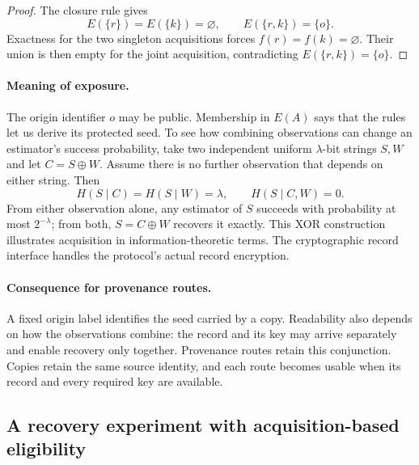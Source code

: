 \documentclass[pdflatex]{sn-jnl}
\theoremstyle{thmstyleone}
\theoremstyle{thmstylethree}
\theoremstyle{thmstyletwo}
\begin{document}
\begin{proof}
The closure rule gives
\[
  E(\{r\})=E(\{k\})=\varnothing,
  \qquad
  E(\{r,k\})=\{o\}.
\]
Exactness for the two singleton acquisitions forces
$f(r)=f(k)=\varnothing$.  Their union is then empty for the joint
acquisition, contradicting $E(\{r,k\})=\{o\}$.
\end{proof}

\paragraph{Meaning of exposure.}
The origin identifier $o$ may be public. Membership in $E(A)$ says that
the rules let us derive its protected seed. To see how combining
observations can change an estimator's success probability, take two
independent uniform $\lambda$-bit strings $S,W$ and let
$C=S\mathbin{\oplus}W$. Assume there is no further observation that
depends on either string. Then
\[
  H(S\mid C)=H(S\mid W)=\lambda,
  \qquad H(S\mid C,W)=0.
\]
From either observation alone, any estimator of $S$ succeeds with
probability at most $2^{-\lambda}$; from both, $S=C\mathbin{\oplus}W$
recovers it exactly. This XOR construction illustrates acquisition in
information-theoretic terms. The cryptographic record interface handles
the protocol's actual record encryption.

\paragraph{Consequence for provenance routes.}
A fixed origin label identifies the seed carried by a copy. Readability
also depends on how the observations combine: the record and its key
may arrive separately and enable recovery only together. Provenance
routes retain this conjunction. Copies retain the same source identity,
and each route becomes usable when its record and every required key
are available.

\subsection{A recovery experiment with acquisition-based eligibility}
\end{document}
